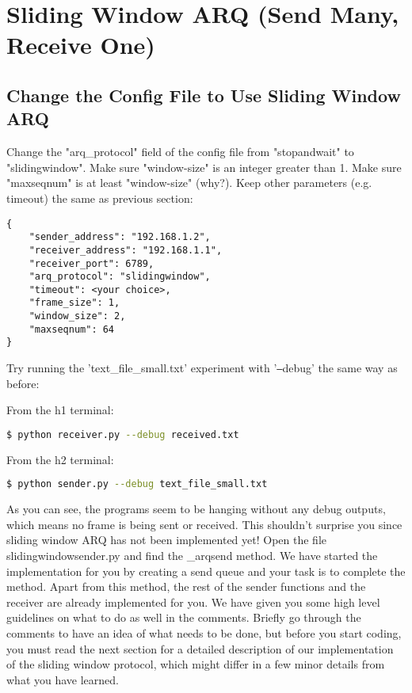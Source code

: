 \documentclass[11pt]{article}
\begin{document}
\section{Sliding Window ARQ (Send Many, Receive One)}

\subsection{Change the Config File to Use Sliding Window ARQ}
Change the "arq\_protocol" field of the config file from "stopandwait" to "slidingwindow". Make sure "window-size" is an integer greater than 1. Make sure "maxseqnum" is at least "window-size" (why?). Keep other parameters (e.g. timeout) the same as previous section:

\begin{lstlisting}[caption={Sliding Window Configuration}]
{
    "sender_address": "192.168.1.2",
    "receiver_address": "192.168.1.1",
    "receiver_port": 6789,
    "arq_protocol": "slidingwindow",
    "timeout": <your choice>,
    "frame_size": 1,
    "window_size": 2,
    "maxseqnum": 64
}
\end{lstlisting}


Try running the 'text\_file\_small.txt' experiment with '\texttt{--}debug' the same way as before:

\noindent From the h1 terminal:
\begin{lstlisting}[language=bash]
$ python receiver.py --debug received.txt
\end{lstlisting}
From the h2 terminal:
\begin{lstlisting}[language=bash]
$ python sender.py --debug text_file_small.txt
\end{lstlisting}

As you can see, the programs seem to be hanging without any debug outputs, which means no frame is being sent or received. This shouldn't surprise you since sliding window ARQ has not been implemented yet! Open the file slidingwindowsender.py and find the \_arqsend method. We have started the implementation for you by creating a send queue and your task is to complete the method. Apart from this method, the rest of the sender functions and the receiver are already implemented for you. We have given you some high level guidelines on what to do as well in the comments. Briefly go through the comments to have an idea of what needs to be done, but before you start coding, you must read the next section for a detailed description of our implementation of the sliding window protocol, which might differ in a few minor details from what you have learned.
\end{document}
